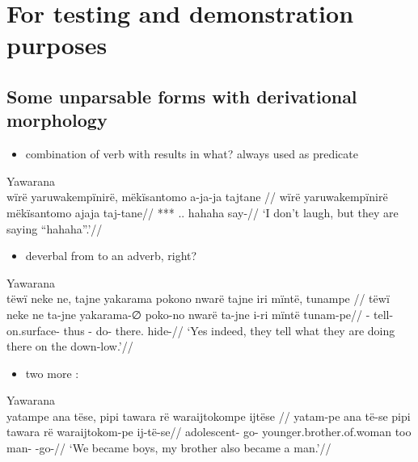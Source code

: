 \documentclass{memoir}
\begin{document}
\chapter{For testing and demonstration purposes}

\section{Some unparsable forms with derivational morphology}

\begin{itemize}
\tightlist
\item
  combination of verb with  results in what? always used
  as predicate
\end{itemize}

\ex Yawarana \\
\label{convrisamaj-07}    \begingl
    \glpreamble  wïrë yaruwakempïnirë, mëkïsantomo a-ja-ja tajtane //
    \gla wïrë yaruwakempïnirë mëkïsantomo ajaja taj-tane//
    \glb {} *** .. hahaha say-//
        \glft ‘I don’t laugh, but they are saying “hahaha”.’//  
    \endgl 
\xe

\begin{itemize}
\tightlist
\item
  deverbal from  to an adverb, right?
\end{itemize}

\ex Yawarana \\
\label{convrisamaj-09}    \begingl
    \glpreamble  tëwï neke ne, tajne yakarama pokono nwarë tajne iri mïntë, tunampe //
    \gla tëwï neke ne ta-jne yakarama-∅ poko-no nwarë ta-jne i-ri mïntë tunam-pe//
    \glb {}   - tell- on.surface- thus - do- there. hide-//
        \glft ‘Yes indeed, they tell what they are doing there on the down-low.’//  
    \endgl 
\xe

\begin{itemize}
\tightlist
\item
  two more :
\end{itemize}

\ex Yawarana \\
\label{anfoperso-40}    \begingl
    \glpreamble  yatampe ana tëse, pipi tawara rë waraijtokompe ijtëse //
    \gla yatam-pe ana të-se pipi tawara rë waraijtokom-pe ij-të-se//
    \glb adolescent-  go- younger.brother.of.woman too  man- -go-//
        \glft ‘We became boys, my brother also became a man.’//  
    \endgl 
\xe
\end{document}
